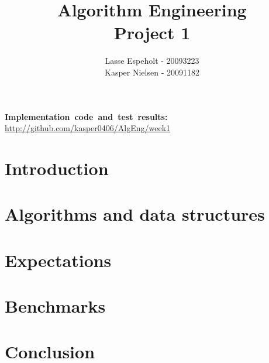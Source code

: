 \documentclass[a4paper]{article}
\begin{document}
\title{Algorithm Engineering\\Project 1}

\author{Lasse Espeholt - 20093223\\
Kasper Nielsen - 20091182}

\maketitle
\vfill{}

\textbf{Implementation~code~and~test~results:} 
\url{http://github.com/kasper0406/AlgEng/week1}
\pagebreak{}\tableofcontents{}\pagebreak{}

\section{Introduction}


	
\section{Algorithms and data structures}



\section{Expectations}



\section{Benchmarks}



\section{Conclusion}


\end{document}
